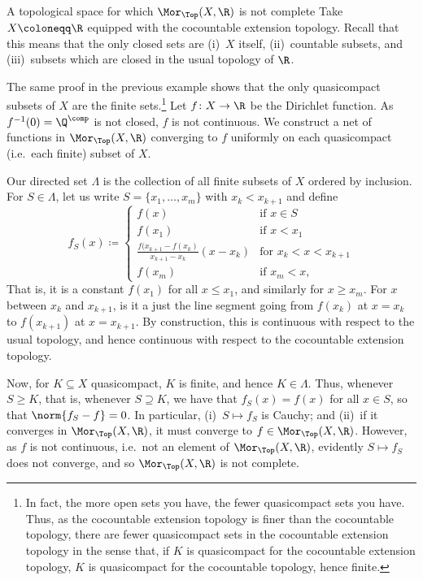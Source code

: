 \begin{exm}{A topological space for which $\Mor _{\Top}(X,\R )$ is not complete}{}
Take $X\coloneqq \R$ equipped with the cocountable extension topology.  Recall that this means that the only closed sets are (i)~$X$ itself, (ii)~countable subsets, and (iii)~subsets which are closed in the usual topology of $\R$.

The same proof in the previous example shows that the only quasicompact subsets of $X$ are the finite sets.\footnote{In fact, the more open sets you have, the fewer quasicompact sets you have.  Thus, as the cocountable extension topology is finer than the cocountable topology, there are fewer quasicompact sets in the cocountable extension topology in the sense that, if $K$ is quasicompact for the cocountable extension topology, $K$ is quasicompact for the cocountable topology, hence finite.}  Let $f\colon X\rightarrow \R$ be the Dirichlet function.  As $f^{-1}(0)=\Q ^{\comp}$ is not closed, $f$ is not continuous.  We construct a net of functions in $\Mor _{\Top}(X,\R )$ converging to $f$ uniformly on each quasicompact (i.e.~each finite) subset of $X$.

Our directed set $\Lambda$ is the collection of all finite subsets of $X$ ordered by inclusion.  For $S\in \Lambda$, let us write $S=\{ x_1,\ldots ,x_m\}$ with $x_k<x_{k+1}$ and define
\begin{equation*}
f_S(x)\coloneqq \begin{cases}f(x) & \text{if }x\in S \\ f(x_1) & \text{if }x<x_1 \\ \frac{f(x_{k+1}-f(x_k)}{x_{k+1}-x_k}(x-x_k) & \text{for }x_k<x<x_{k+1} \\ f(x_m) & \text{if }x_m<x,\end{cases}
\end{equation*}
That is, it is a constant $f(x_1)$ for all $x\leq x_1$, and similarly for $x\geq x_m$.  For $x$ between $x_k$ and $x_{k+1}$, is it a just the line segment going from $f(x_k)$ at $x=x_k$ to $f(x_{k+1})$ at $x=x_{k+1}$.  By construction, this is continuous with respect to the usual topology, and hence continuous with respect to the cocountable extension topology.

Now, for $K\subseteq X$ quasicompact, $K$ is finite, and hence $K\in \Lambda$.  Thus, whenever $S\geq K$, that is, whenever $S\supseteq K$, we have that $f_S(x)=f(x)$ for all $x\in S$, so that $\norm{f_S-f}=0$.  In particular, (i)~$S\mapsto f_S$ is Cauchy; and (ii)~if it converges in $\Mor _{\Top}(X,\R )$, it must converge to $f\in \Mor _{\Top}(X,\R )$.  However, as $f$ is not continuous, i.e.~not an element of $\Mor _{\Top}(X,\R )$, evidently $S\mapsto f_S$ does not converge, and so $\Mor _{\Top}(X,\R )$ is not complete.
\end{exm}
